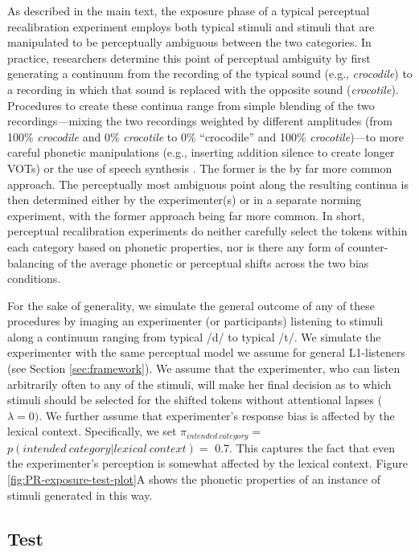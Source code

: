 \documentclass[
  11pt,
  man,floatsintext]{apa6}
\begin{document}
As described in the main text, the exposure phase of a typical perceptual recalibration experiment employs both typical stimuli and stimuli that are manipulated to be perceptually ambiguous between the two categories. In practice, researchers determine this point of perceptual ambiguity by first generating a continuum from the recording of the typical sound (e.g., \emph{crocodile}) to a recording in which that sound is replaced with the opposite sound (\emph{crocotile}). Procedures to create these continua range from simple blending of the two recordings---mixing the two recordings weighted by different amplitudes (from 100\% \emph{crocodile} and 0\% \emph{crocotile} to 0\% ``crocodile'' and 100\% \emph{crocotile})---to more careful phonetic manipulations (e.g., inserting addition silence to create longer VOTs) or the use of speech synthesis \autocite[for an insightful critique of the frequently used blending procedure, see][]{theodore-cummings2021}. The former is the by far more common approach. The perceptually most ambiguous point along the resulting continua is then determined either by the experimenter(s) or in a separate norming experiment, with the former approach being far more common. In short, perceptual recalibration experiments do neither carefully select the tokens within each category based on phonetic properties, nor is there any form of counter-balancing of the average phonetic or perceptual shifts across the two bias conditions.

For the sake of generality, we simulate the general outcome of any of these procedures by imaging an experimenter (or participants) listening to stimuli along a continuum ranging from typical /d/ to typical /t/. We simulate the experimenter with the same perceptual model we assume for general L1-listeners (see Section \ref{sec:framework}). We assume that the experimenter, who can listen arbitrarily often to any of the stimuli, will make her final decision as to which stimuli should be selected for the shifted tokens without attentional lapses (\(\lambda=0)\). We further assume that experimenter's response bias is affected by the lexical context. Specifically, we set \(\pi_{intended~category} =\) \(p(intended~category | lexical~context) =\) 0.7. This captures the fact that even the experimenter's perception is somewhat affected by the lexical context. Figure \ref{fig:PR-exposure-test-plot}A shows the phonetic properties of an instance of stimuli generated in this way.

\subsection{Test}\label{test}
\end{document}
